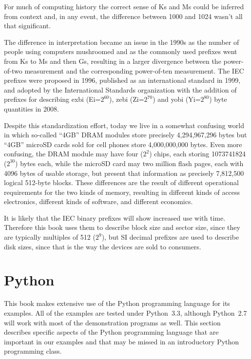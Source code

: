 For much of computing history the correct sense of Ks and Ms could be
inferred from context and, in any event, the difference between 1000
and 1024 wasn't all that significant.

The difference in interpretation became an issue in the 1990s as the
number of people using computers mushroomed and as the commonly used
prefixes went from Ks to Ms and then Gs, resulting in a larger
divergence between the power-of-two measurement and the corresponding
power-of-ten measurement. The IEC prefixes were proposed in
1996\cite{iec:1996},
published as an international standard in 1999, and adopted by the
International Standards organization with the addition of prefixes for
describing exbi (Ei=$2^{60}$), zebi (Zi=$2^{70}$) and yobi (Yi=$2^{80}$) byte
quantities in 2008\cite{iec:80000-13:2008}.  

Despite this standardization effort, today we live in a somewhat
confusing world in which so-called ``4GB'' DRAM modules 
store precisely 4,294,967,296 bytes
but ``4GB'' microSD cards sold for cell
phones store 4,000,000,000 bytes. Even more confusing, the DRAM
module may have four ($2^{2}$) chips, each storing 1073741824
($2^{30}$) bytes each, while the microSD card may two million flash
pages, each with 4096 bytes of usable storage, but present that
information as precisely 7,812,500 logical 512-byte blocks.  These
differences are the result of different operational requirements for
the two kinds of memory, resulting in different kinds of access
electronics, different kinds of software, and different economics. 

It is likely that the IEC binary prefixes will show increased use
with time. Therefore this book uses them to describe block size and
sector size, since they are typically multiples of 512 ($2^9$), but 
SI decimal prefixes are used to describe disk sizes, since that is the way
the devices are sold to consumers.


\section{Python}
This book makes extensive use of the Python programming language for
its examples. All of the examples are tested under Python~3.3,
although Python~2.7 will work with most of the demonstration programs
as well.  This section describes specific aspects of the Python
programming language that are important in our examples and that may
be missed in an introductory Python programming class.

